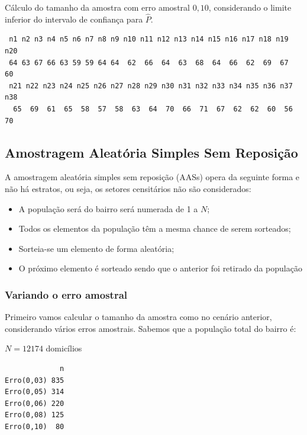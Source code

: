 \documentclass[12pt]{article}\usepackage[]{graphicx}\usepackage[]{color}
\makeatletter
\newenvironment{kframe}{%
 \def\at@end@of@kframe{}%
 \ifinner\ifhmode%
  \def\at@end@of@kframe{\end{minipage}}%
  \begin{minipage}{\columnwidth}%
 \fi\fi%
 \def\FrameCommand##1{\hskip\@totalleftmargin \hskip-\fboxsep
 \colorbox{shadecolor}{##1}\hskip-\fboxsep
     \hskip-\linewidth \hskip-\@totalleftmargin \hskip\columnwidth}%
 \MakeFramed {\advance\hsize-\width
   \@totalleftmargin\z@ \linewidth\hsize
   \@setminipage}}%
 {\par\unskip\endMakeFramed%
 \at@end@of@kframe}
\newenvironment{knitrout}{}{} %
\makeatother
\begin{document}
Cálculo do tamanho da amostra com erro amostral $0,10$, considerando o limite
inferior do intervalo de confiança para $\hat{P}$.


\begin{knitrout}\footnotesize
{}\color{fgcolor}\begin{kframe}
\begin{verbatim}
 n1 n2 n3 n4 n5 n6 n7 n8 n9 n10 n11 n12 n13 n14 n15 n16 n17 n18 n19 n20
 64 63 67 66 63 59 59 64 64  62  66  64  63  68  64  66  62  69  67  60
 n21 n22 n23 n24 n25 n26 n27 n28 n29 n30 n31 n32 n33 n34 n35 n36 n37 n38
  65  69  61  65  58  57  58  63  64  70  66  71  67  62  62  60  56  70
\end{verbatim}
\end{kframe}
\end{knitrout}

\subsection{Amostragem Aleatória Simples Sem Reposição}
\indent

A amostragem aleatória simples sem reposição (AASs) opera da seguinte forma e
não há estratos, ou seja, os setores censitários não são considerados:
\begin{itemize}
  \item A população será do bairro será numerada de 1 a $N$;
  \item Todos os elementos da população têm a mesma chance de
    serem sorteados;
  \item Sorteia-se um elemento de forma aleatória;
  \item O próximo elemento é sorteado sendo que o anterior foi
    retirado da população
\end{itemize}

\subsubsection{Variando o erro amostral}
\indent
Primeiro vamos calcular o tamanho da amostra como no cenário anterior,
considerando vários erros amostrais. Sabemos que a população total do
bairro é:\\
\indent

$N = 12174$ domicílios \\
\indent



\begin{knitrout}\footnotesize
{}\color{fgcolor}\begin{kframe}
\begin{verbatim}
             n
Erro(0,03) 835
Erro(0,05) 314
Erro(0,06) 220
Erro(0,08) 125
Erro(0,10)  80
\end{verbatim}
\end{kframe}
\end{knitrout}
\end{document}
